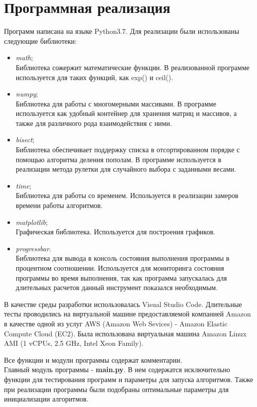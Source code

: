 \documentclass{article}
\numberwithin{equation}{section}
\begin{document}
	\newpage
	\section{Программная реализация}
		Программ написана на языке Python3.7. Для реализации были использованы следующие библиотеки:
		\begin{itemize}
			\item \textit{math};\\
				Библиотека сожержит математические функции. В реализованной программе используется для таких функций, как exp() и ceil().
			\item \textit{numpy};\\
				Библиотека для работы с многомерными массивами. В программе используется как удобный контейнер для хранения матриц и массивов, а также для различного рода взаимодействия с ними.
			\item \textit{bisect};\\
				Библиотека обеспечивает поддержку списка в отсортированном порядке с помощью алгоритма деления пополам. В программе используется в реализации метода рулетки для случайного выбора с заданными весами.
			\item \textit{time};\\
				Библиотека для работы со временем. Используется в реализации замеров времени работы алгоритмов.
			\item \textit{matplotlib};\\
				Графическая библиотека. Используется для построения графиков.
			\item \textit{progressbar}.\\
				Библиотека для вывода в консоль состояния выполнения программы в процентном соотношении. Используется для мониторинга состояния программы во время выполнения, так как программа запускалась для длительных расчетов данный инструмент показался необходимым.
		\end{itemize}

		В качестве среды разработки использовалась Visual Studio Code. Длительные тесты проводились на виртуальной машине предоставляемой компанией Amazon в качестве одной из услуг AWS (Amazon Web Sevices) - Amazon Elastic Compute Cloud (EC2). Была использована виртуальная машина Amazon Linux AMI (1 vCPUs, 2.5 GHz, Intel Xeon Family).

		Все функции и модули программы содержат комментарии.\\
		Главный модуль программы - \textbf{main.py}. В нем содержатся исключительно функции для тестирования программ и параметры для запуска алгоритмов. Также при реализации программы были подобраны оптимальные параметры для инициализации алгоритмов.
\end{document}
